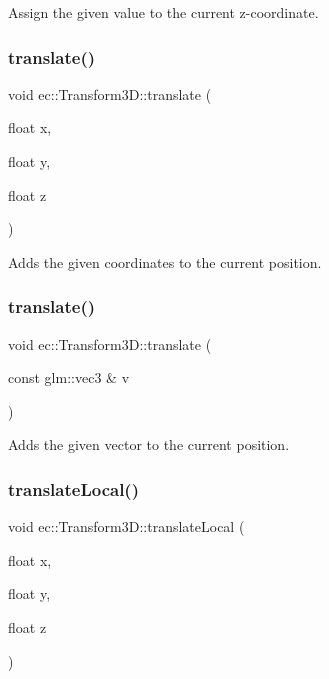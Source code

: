Assign the given value to the current z-\/coordinate. \mbox{\label{classec_1_1_transform3_d_a9c143bdc0bf020940b9b6bd7e2a01d45}} 
\subsubsection{\texorpdfstring{translate()}{translate()}\hspace{0.1cm}{\footnotesize\ttfamily [1/2]}}
{\footnotesize\ttfamily void ec\+::\+Transform3\+D\+::translate (\begin{DoxyParamCaption}\item[{float}]{x,  }\item[{float}]{y,  }\item[{float}]{z }\end{DoxyParamCaption})}

Adds the given coordinates to the current position. \mbox{\label{classec_1_1_transform3_d_ae0290297c16ee5ce4f6cf2855fd26aa0}} 
\subsubsection{\texorpdfstring{translate()}{translate()}\hspace{0.1cm}{\footnotesize\ttfamily [2/2]}}
{\footnotesize\ttfamily void ec\+::\+Transform3\+D\+::translate (\begin{DoxyParamCaption}\item[{const glm\+::vec3 \&}]{v }\end{DoxyParamCaption})}

Adds the given vector to the current position. \mbox{\label{classec_1_1_transform3_d_aa32ee07603a9531e77b189185cbd40e4}} 
\subsubsection{\texorpdfstring{translate\+Local()}{translateLocal()}\hspace{0.1cm}{\footnotesize\ttfamily [1/2]}}
{\footnotesize\ttfamily void ec\+::\+Transform3\+D\+::translate\+Local (\begin{DoxyParamCaption}\item[{float}]{x,  }\item[{float}]{y,  }\item[{float}]{z }\end{DoxyParamCaption})}


